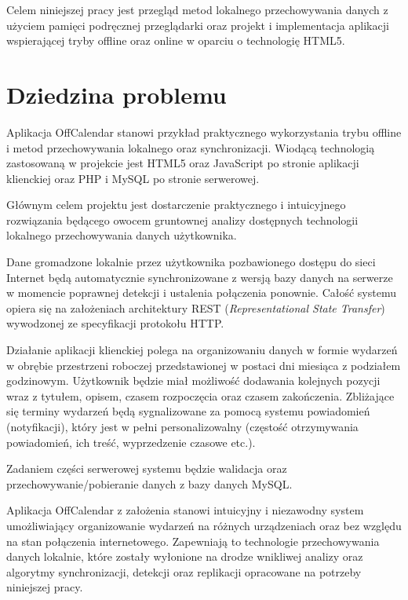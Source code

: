 Celem niniejszej pracy jest przegląd metod lokalnego przechowywania danych z użyciem pamięci podręcznej przeglądarki oraz projekt i implementacja aplikacji wspierającej tryby offline oraz online w oparciu o technologię HTML5.

\section{Dziedzina problemu}
\label{sec:dziedzinaProblemu}

Aplikacja OffCalendar stanowi przykład praktycznego wykorzystania trybu offline i metod przechowywania lokalnego oraz synchronizacji. Wiodącą technologią zastosowaną w projekcie jest HTML5 oraz JavaScript po stronie aplikacji klienckiej oraz PHP i MySQL po stronie serwerowej.

Głównym celem projektu jest dostarczenie praktycznego i intuicyjnego rozwiązania będącego owocem gruntownej analizy dostępnych technologii lokalnego przechowywania danych użytkownika.

Dane gromadzone lokalnie przez użytkownika pozbawionego dostępu do sieci Internet będą automatycznie synchronizowane z wersją bazy danych na serwerze w momencie poprawnej detekcji i ustalenia połączenia ponownie. Całość systemu opiera się na założeniach architektury REST (\emph{Representational State Transfer}) wywodzonej ze specyfikacji protokołu HTTP.

Działanie aplikacji klienckiej polega na organizowaniu danych w formie wydarzeń w obrębie przestrzeni roboczej przedstawionej w postaci dni miesiąca z podziałem godzinowym. Użytkownik będzie miał możliwość dodawania kolejnych pozycji wraz z tytułem, opisem, czasem rozpoczęcia oraz czasem zakończenia. Zbliżające się terminy wydarzeń będą sygnalizowane za pomocą systemu powiadomień (notyfikacji), który jest w pełni personalizowalny (częstość otrzymywania powiadomień, ich treść, wyprzedzenie czasowe etc.).

Zadaniem części serwerowej systemu będzie walidacja oraz przechowywanie/pobieranie danych z bazy danych MySQL.

Aplikacja OffCalendar z założenia stanowi intuicyjny i niezawodny system umożliwiający organizowanie wydarzeń na różnych urządzeniach oraz bez względu na stan połączenia internetowego. Zapewniają to technologie przechowywania danych lokalnie, które zostały wyłonione na drodze wnikliwej analizy oraz algorytmy synchronizacji, detekcji oraz replikacji opracowane na potrzeby niniejszej pracy.











